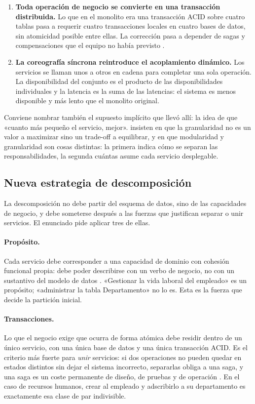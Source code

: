 \begin{enumerate}[leftmargin=1.8em]
  \item \textbf{Toda operación de negocio se convierte en una transacción distribuida.} Lo que en el monolito era una transacción ACID sobre cuatro tablas pasa a requerir cuatro transacciones locales en cuatro bases de datos, sin atomicidad posible entre ellas. La corrección pasa a depender de sagas y compensaciones que el equipo no había previsto \parencite{fordhardparts2021}.
  \item \textbf{La coreografía síncrona reintroduce el acoplamiento dinámico.} Los servicios se llaman unos a otros en cadena para completar una sola operación. La disponibilidad del conjunto es el producto de las disponibilidades individuales y la latencia es la suma de las latencias: el sistema es menos disponible y más lento que el monolito original.
\end{enumerate}

Conviene nombrar también el supuesto implícito que llevó allí: la idea de que «cuanto más pequeño el servicio, mejor». \textcite{fordhardparts2021} insisten en que la granularidad no es un valor a maximizar sino un trade-off a equilibrar, y en que modularidad y granularidad son cosas distintas: la primera indica cómo se separan las responsabilidades, la segunda cuántas asume cada servicio desplegable.

\subsection{Nueva estrategia de descomposición}

La descomposición no debe partir del esquema de datos, sino de las capacidades de negocio, y debe someterse después a las fuerzas que justifican separar o unir servicios. El enunciado pide aplicar tres de ellas.

\paragraph{Propósito.} Cada servicio debe corresponder a una capacidad de dominio con cohesión funcional propia: debe poder describirse con un verbo de negocio, no con un sustantivo del modelo de datos \parencite{fordhardparts2021}. «Gestionar la vida laboral del empleado» es un propósito; «administrar la tabla Departamento» no lo es. Esta es la fuerza que decide la partición inicial.

\paragraph{Transacciones.} Lo que el negocio exige que ocurra de forma atómica debe residir dentro de un único servicio, con una única base de datos y una única transacción ACID. Es el criterio más fuerte para \emph{unir} servicios: si dos operaciones no pueden quedar en estados distintos sin dejar el sistema incorrecto, separarlas obliga a una saga, y una saga es un coste permanente de diseño, de pruebas y de operación \parencite{fordhardparts2021}. En el caso de recursos humanos, crear al empleado y adscribirlo a su departamento es exactamente esa clase de par indivisible.

